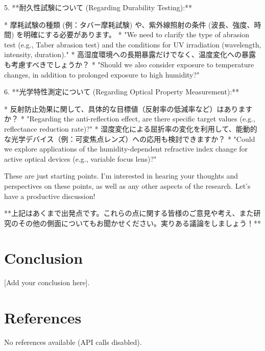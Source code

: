 \documentclass{article}
\begin{document}
5. **耐久性試験について (Regarding Durability Testing):**

    *   摩耗試験の種類 (例：タバー摩耗試験) や、紫外線照射の条件 (波長、強度、時間) を明確にする必要があります。
        *   "We need to clarify the type of abrasion test (e.g., Taber abrasion test) and the conditions for UV irradiation (wavelength, intensity, duration)."
    *   高湿度環境への長期暴露だけでなく、温度変化への暴露も考慮すべきでしょうか？
        *   "Should we also consider exposure to temperature changes, in addition to prolonged exposure to high humidity?"

6. **光学特性測定について (Regarding Optical Property Measurement):**

    *   反射防止効果に関して、具体的な目標値（反射率の低減率など）はありますか？
        *   "Regarding the anti-reflection effect, are there specific target values (e.g., reflectance reduction rate)?"
    *   湿度変化による屈折率の変化を利用して、能動的な光学デバイス（例：可変焦点レンズ）への応用も検討できますか？
        *   "Could we explore applications of the humidity-dependent refractive index change for active optical devices (e.g., variable focus lens)?"

These are just starting points. I'm interested in hearing your thoughts and perspectives on these points, as well as any other aspects of the research. Let's have a productive discussion!

**上記はあくまで出発点です。これらの点に関する皆様のご意見や考え、また研究のその他の側面についてもお聞かせください。実りある議論をしましょう！**


\section{Conclusion}
[Add your conclusion here].

\section{References}
No references available (API calls disabled).
\end{document}
